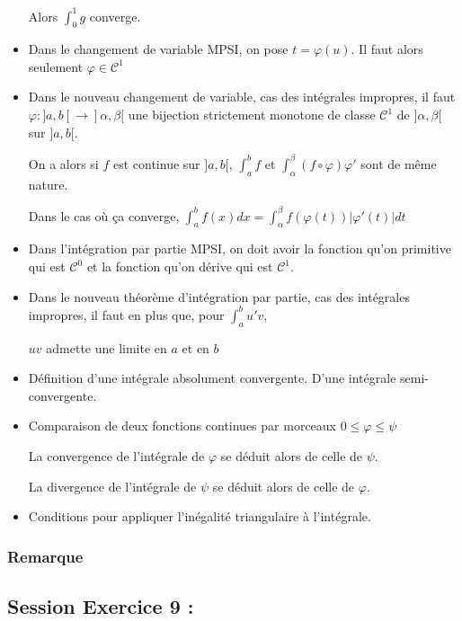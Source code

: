 \documentclass[a4paper, 11pt, hidelinks]{article}
\begin{document}
\begin{itemize}
    Alors $\displaystyle\int_0^1 g$ converge.
    \item Dans le changement de variable MPSI, on pose $t=\varphi (u)$. Il faut alors seulement $\varphi \in \mathscr{C}^1$
    \item Dans le nouveau changement de variable, cas des intégrales impropres, il faut $\varphi : ]a,b[ \to ]\alpha,\beta[$ une bijection strictement monotone
    de classe $\mathscr{C}^1$ de $]\alpha,\beta[$ sur $]a,b[$.
    
    On a alors si $f$ est continue sur $]a,b[$, $\displaystyle\int_a^b f$ et $\displaystyle\int_\alpha^\beta (f \circ \varphi)\varphi '$ sont de même nature.

    Dans le cas où ça converge, $\displaystyle\int_a^b f(x)dx=\displaystyle\int_\alpha^\beta f(\varphi(t))|\varphi '(t)|dt$
    \item Dans l'intégration par partie MPSI, on doit avoir la fonction qu'on primitive qui est $\mathscr{C}^0$ et la fonction qu'on dérive qui est $\mathscr{C}^1$.
    \item Dans le nouveau théorème d'intégration par partie, cas des intégrales impropres, il faut en plus que, pour $\displaystyle\int_a^b u'v$,
    
    $uv$ admette une limite en $a$ et en $b$
    \item Définition d'une intégrale absolument convergente. D'une intégrale semi-convergente.
    \item Comparaison de deux fonctions continues par morceaux $0\leq \varphi \leq \psi$
    
    La convergence de l'intégrale de $\varphi$ se déduit alors de celle de $\psi$.

    La divergence de l'intégrale de $\psi$ se déduit alors de celle de $\varphi$.
    \item Conditions pour appliquer l'inégalité triangulaire à l'intégrale.
\end{itemize}




\subsubsection{Remarque}





\subsection{Session Exercice 9 :}
\end{document}
